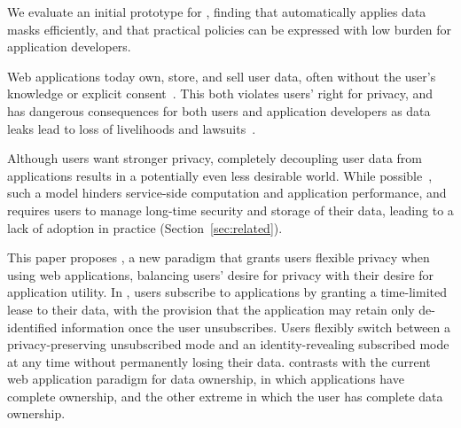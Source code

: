 We evaluate an initial prototype for \sys, finding that \sys automatically applies
data masks efficiently, and that practical policies can be expressed with low burden for application
developers.
\fi

\iffalse
%
%
Web applications today own, store, and sell user data, often without the user's knowledge or
explicit consent~\cite{nytimes:fb, npr:data}. This both violates users' right for privacy, and has
dangerous consequences for both users and application developers as data leaks lead to loss of
livelihoods and lawsuits~\cite{breach:amazon,breach:twitter, breach:fb, breach:marriott,
breach:quora}.

Although users want stronger privacy, completely decoupling user data from applications results in a
potentially even less desirable world. While possible~\cite{solid, amber, w5, blockstack, bstore}, such a
model hinders service-side computation and application performance, and requires users to manage
long-time security and storage of their data, leading to a lack of adoption in practice (Section~\ref{sec:related}).

This paper proposes \name, a new paradigm that grants users flexible privacy when using web
applications, balancing users' desire for privacy with their desire for application utility. In
\name, users subscribe to applications by granting a time-limited lease to their data, with the
provision that the application may retain only de-identified information once the user unsubscribes.
Users flexibly switch between a privacy-preserving unsubscribed mode and an identity-revealing
subscribed mode at any time without permanently losing their data. \name contrasts
with the current web application paradigm for data ownership, in which applications have complete
ownership, and the other extreme in which the user has complete data ownership.%

